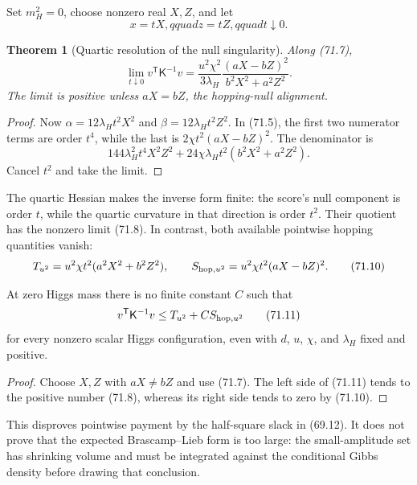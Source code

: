 \documentclass[11pt]{article}
\newtheorem{theorem}{Theorem}[section]
\theoremstyle{remark}
\begin{document}
Set \(m_H^2=0\), choose nonzero real \(X,Z\), and let
\[
 x=tX,qquad z=tZ,qquad t\downarrow0.             \tag{71.7}
\]

\begin{theorem}[Quartic resolution of the null singularity]
\label{thm:v17v71-limit}
Along (71.7),
\[
\boxed{
 \lim_{t\downarrow0}v^{\mathsf T}\mathsf K^{-1}v
 =\frac{u^2\chi^2}{3\lambda_H}
 \frac{(aX-bZ)^2}{b^2X^2+a^2Z^2}.}               \tag{71.8}
\]
The limit is positive unless \(aX=bZ\), the hopping-null alignment.
\end{theorem}

\begin{proof}
Now
\(\alpha=12\lambda_Ht^2X^2\) and
\(\beta=12\lambda_Ht^2Z^2\).  In (71.5), the first two numerator
terms are order \(t^4\), while the last is
\(2\chi t^2(aX-bZ)^2\).  The denominator is
\[
 144\lambda_H^2t^4X^2Z^2
 +24\chi\lambda_Ht^2(b^2X^2+a^2Z^2).             \tag{71.9}
\]
Cancel \(t^2\) and take the limit.
\end{proof}

The quartic Hessian makes the inverse form finite: the score's null
component is order \(t\), while the quartic curvature in that direction
is order \(t^2\).  Their quotient has the nonzero limit (71.8).
In contrast, both available pointwise hopping quantities vanish:
\[
 T_{u^2}=u^2\chi t^2(a^2X^2+b^2Z^2),
 \qquad
 S_{{\rm hop},u^2}=u^2\chi t^2(aX-bZ)^2.          \tag{71.10}
\]

\begin{countertheorem}
\label{ctr:v17v71-slack}
At zero Higgs mass there is no finite constant \(C\) such that
\[
 v^{\mathsf T}\mathsf K^{-1}v
 \leq T_{u^2}+C S_{{\rm hop},u^2}                 \tag{71.11}
\]
for every nonzero scalar Higgs configuration, even with \(d\),
\(u\), \(\chi\), and \(\lambda_H\) fixed and positive.
\end{countertheorem}

\begin{proof}
Choose \(X,Z\) with \(aX\neq bZ\) and use (71.7).  The left side of
(71.11) tends to the positive number (71.8), whereas its right side
tends to zero by (71.10).
\end{proof}

This disproves pointwise payment by the half-square slack in (69.12).
It does not prove that the expected Brascamp--Lieb form is too large:
the small-amplitude set has shrinking volume and must be integrated
against the conditional Gibbs density before drawing that conclusion.
\end{document}
